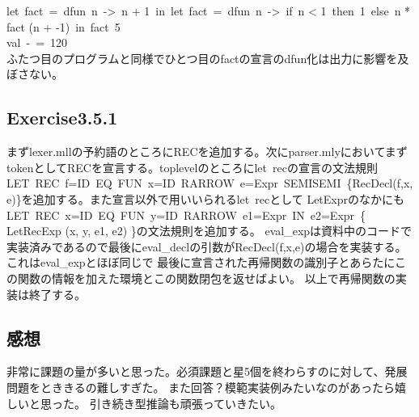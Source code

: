 \documentclass[a4paper,11pt,oneside,openany]{jsarticle}
\begin{document}
    let\ fact\ =\ dfun\ n\ ->\ n + 1\ in\ let\ fact\ =\ dfun\ n\ ->\ if\ n < 1\ then\ 1\ else\ n * fact (n + -1)\ in\ fact\ 5\\
    val\ -\ =\ 120\\
    ふたつ目のプログラムと同様でひとつ目のfactの宣言のdfun化は出力に影響を及ぼさない。




\subsection{Exercise3.5.1}
    まずlexer.mllの予約語のところにRECを追加する。次にparser.mlyにおいてまずtokenとしてRECを宣言する。toplevelのところにlet\ recの宣言の文法規則
    LET\ REC\ f=ID\ EQ\ FUN\ x=ID\ RARROW\ e=Expr\ SEMISEMI\ \{RecDecl(f,x,e)\}を追加する。また宣言以外で用いいられるlet\ recとして
    LetExprのなかにもLET\ REC\ x=ID\ EQ\ FUN\ y=ID\ RARROW\ e1=Expr\ IN\ e2=Expr\ \{ LetRecExp (x, y, e1, e2) \}の文法規則を追加する。
    eval\_expは資料中のコードで実装済みであるので最後にeval\_declの引数がRecDecl(f,x,e)の場合を実装する。これはeval\_expとほぼ同じで
    最後に宣言された再帰関数の識別子とあらたにこの関数の情報を加えた環境とこの関数閉包を返せばよい。
    以上で再帰関数の実装は終了する。

\subsection{感想}
    非常に課題の量が多いと思った。必須課題と星5個を終わらすのに対して、発展問題をとききるの難しすぎた。
    また回答？模範実装例みたいなのがあったら嬉しいと思った。
    引き続き型推論も頑張っていきたい。
\end{document}
